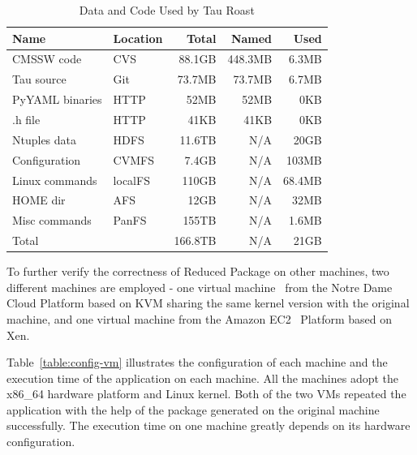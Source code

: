 \documentclass[procedia]{easychair}
\begin{document}
\begin{table}
	\centering
	    \begin{tabular}{llrrr}
	        \hline
	        \bf Name & \bf Location & \bf Total & \bf Named & \bf Used \\ 
	        \hline
	        CMSSW code     & CVS & 88.1GB & 448.3MB & 6.3MB\\ \hline
	        Tau source       & Git & 73.7MB & 73.7MB & 6.7MB \\ \hline
	        PyYAML binaries    & HTTP & 52MB & 52MB & 0KB \\ \hline
	        .h file       & HTTP& 41KB & 41KB & 0KB \\ \hline \hline
	        Ntuples data    & HDFS& 11.6TB & N/A& 20GB \\ \hline
	        Configuration & CVMFS & 7.4GB & N/A & 103MB \\ \hline
	        Linux commands & localFS & 110GB &  N/A & 68.4MB \\ \hline     
	        HOME dir& AFS &12GB & N/A & 32MB\\ \hline
	        Misc commands & PanFS & 155TB & N/A  & 1.6MB \\ \hline
	        Total      &    & 166.8TB            & N/A & 21GB \\ \hline
	    \end{tabular}
	    \caption{Data and Code Used by Tau Roast}
	    \label{table:size-original-real}
\end{table}
	    
To further verify the correctness of Reduced Package on other machines, two different machines are employed -
one virtual
machine~\cite{goldberg1974survey} from the Notre Dame Cloud Platform based on KVM sharing the same kernel version with the original machine,
and one virtual machine from  the Amazon EC2~\cite{amazon2010amazon} Platform based on Xen.

Table~\ref{table:config-vm} illustrates the configuration of 
each machine and the execution time of the application on each machine.
All the machines adopt the x86\_64 hardware platform and Linux kernel.
Both of the two VMs repeated the application with the help of the package generated on the original machine successfully.
The execution time on one machine greatly depends on its hardware configuration.
\end{document}
